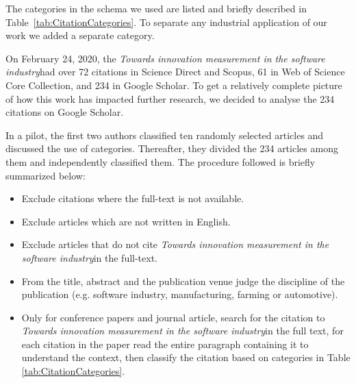 \documentclass[sigplan]{acmart}
\newcommand{\theArticle}{\textit{Towards innovation measurement in the software industry}}
\begin{document}
The categories in the schema we used are listed and briefly described in Table~\ref{tab:CitationCategories}. To separate any industrial application of our work we added a separate category. 

On February 24, 2020, the \theArticle  had over 72 citations in Science Direct and Scopus, 61 in Web of Science Core Collection, and 234 in Google Scholar. To get a relatively complete picture of how this work has impacted further research, we decided to analyse the 234 citations on Google Scholar. 

In a pilot, the first two authors classified ten randomly selected articles and discussed the use of categories. Thereafter, they divided the 234 articles among them and  independently classified them. The procedure followed is briefly summarized below: 
\begin{itemize}
\item Exclude citations where the full-text is not available. 
\item Exclude articles which are not written in English.
\item Exclude articles  that do not cite \theArticle in the full-text.
\item From the title, abstract and the publication venue judge the discipline of the publication (e.g. software industry, manufacturing, farming or automotive).
\item Only for conference papers and journal article, search for the citation to \theArticle in the full text, for each citation in the paper  read the entire paragraph containing it to understand the context, then classify the citation based on categories in Table \ref{tab:CitationCategories}.
\end{itemize}
 
\end{document}

